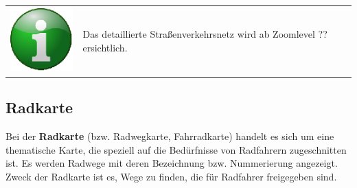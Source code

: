 \documentclass[10pt]{scrreprt}
\begin{document}
\vspace{3mm}
\begin{tabular}{>{\centering \arraybackslash}m{1cm} m{14cm}}
\includegraphics[scale=0.5]{images/info.eps} & Das detaillierte Straßenverkehrsnetz wird ab Zoomlevel ?? ersichtlich.
\end{tabular}




\subsection{Radkarte}  
Bei der \textbf{Radkarte} (bzw. Radwegkarte, Fahrradkarte) handelt es sich um eine thematische Karte, die speziell auf die Bedürfnisse von Radfahrern zugeschnitten ist. Es werden Radwege mit deren Bezeichnung bzw. Nummerierung angezeigt. Zweck der Radkarte ist es, Wege zu finden, die für Radfahrer freigegeben sind.

\vspace{3mm}
\begin{figure}[!htb]
	\centering
    \hspace{5mm}
\end{figure} 
\end{document}
